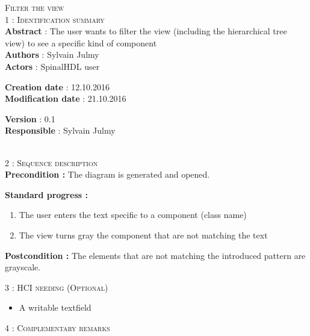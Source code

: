 \begin{flushleft}
    \textsc{\huge Filter the view}\\[0.5cm]

    \BlackLine
    \textsc{\Large 1 : Identification summary}\\[0.3cm]

        \textbf{\large Abstract} : The user wants to filter the view (including the hierarchical tree view) to see a specific kind of component \\[0.1cm]

        \textbf{\large Authors} : Sylvain Julmy \\[0.3cm]			

        \textbf{\large Actors} : SpinalHDL user \\[0.1cm]	
    \begin{minipage}{0.40\textwidth}
        \begin{flushleft}	
            \textbf{\large Creation date} : 12.10.2016 \\[0.1cm]

            \textbf{\large Modification date} : 21.10.2016 \\[0.1cm]
        \end{flushleft}
    \end{minipage}
    \begin{minipage}{0.40\textwidth}
        \begin{flushleft}
            \textbf{\large Version} : 0.1 \\[0.1cm]

            \textbf{\large Responsible} : Sylvain Julmy \\[0.1cm]
        \end{flushleft}
    \end{minipage}
    \\[0.5cm]
    \BlackLine
    \textsc{\Large 2 : Sequence description}\\[0.3cm]

    \textbf{\large Precondition :} The diagram is generated and opened.

    \textbf{\large  Standard progress :}
    \begin{enumerate}[nosep]
        \item The user enters the text specific to a component (class name)
        \item The view turns gray the component that are not matching the text
    \end{enumerate}

    \textbf{\large Postcondition :} The elements that are not matching the introduced pattern are grayscale.

    \BlackLine
    \textsc{\Large 3 : HCI needing (Optional)}\\[0.3cm]

    \begin{itemize}
        \item A writable textfield
    \end{itemize}

    \BlackLine
    \textsc{\Large 4 : Complementary remarks}\\[0.3cm]

\end{flushleft}
